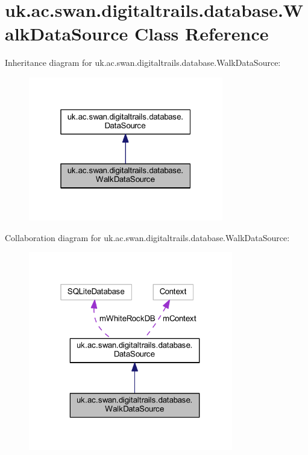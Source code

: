\hypertarget{classuk_1_1ac_1_1swan_1_1digitaltrails_1_1database_1_1_walk_data_source}{\section{uk.\+ac.\+swan.\+digitaltrails.\+database.\+Walk\+Data\+Source Class Reference}
\label{classuk_1_1ac_1_1swan_1_1digitaltrails_1_1database_1_1_walk_data_source}
}


Inheritance diagram for uk.\+ac.\+swan.\+digitaltrails.\+database.\+Walk\+Data\+Source\+:\nopagebreak
\begin{figure}[H]
\begin{center}
\leavevmode
\includegraphics[width=241pt]{classuk_1_1ac_1_1swan_1_1digitaltrails_1_1database_1_1_walk_data_source__inherit__graph}
\end{center}
\end{figure}


Collaboration diagram for uk.\+ac.\+swan.\+digitaltrails.\+database.\+Walk\+Data\+Source\+:\nopagebreak
\begin{figure}[H]
\begin{center}
\leavevmode
\includegraphics[width=253pt]{classuk_1_1ac_1_1swan_1_1digitaltrails_1_1database_1_1_walk_data_source__coll__graph}
\end{center}
\end{figure}
